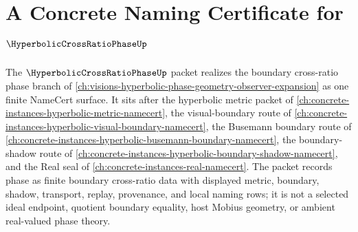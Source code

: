 \chapter{A Concrete Naming Certificate for $\HyperbolicCrossRatioPhaseUp$}
\label{ch:concrete-instances-hyperbolic-cross-ratio-phase-namecert}

The $\HyperbolicCrossRatioPhaseUp$ packet realizes the boundary cross-ratio phase branch of \autoref{ch:visions-hyperbolic-phase-geometry-observer-expansion} as one finite NameCert surface. It sits after the hyperbolic metric packet of \autoref{ch:concrete-instances-hyperbolic-metric-namecert}, the visual-boundary route of \autoref{ch:concrete-instances-hyperbolic-visual-boundary-namecert}, the Busemann boundary route of \autoref{ch:concrete-instances-hyperbolic-busemann-boundary-namecert}, the boundary-shadow route of \autoref{ch:concrete-instances-hyperbolic-boundary-shadow-namecert}, and the Real seal of \autoref{ch:concrete-instances-real-namecert}. The packet records phase as finite boundary cross-ratio data with displayed metric, boundary, shadow, transport, replay, provenance, and local naming rows; it is not a selected ideal endpoint, quotient boundary equality, host Mobius geometry, or ambient real-valued phase theory.



